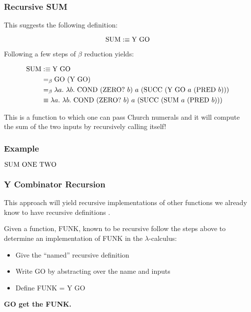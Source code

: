 \documentclass{beamer}
\begin{document}
\begin{frame}
	\frametitle{Recursive SUM}

	This suggests the following definition:

	$$\text{SUM} :\equiv \text{Y} \ \text{GO}$$

	Following a few steps of $\beta$ reduction yields:

	\begin{align*}
		\SUM &:\equiv \YCOMB \ \GO \\
		&\beq \GO \ (\YCOMB \ \GO) \\
		&\beq \lambda a. \ \lambda b. \ \COND \ (\ISITZERO \ b) \ a \ (\SUCC \ (\YCOMB \ \GO \ a \ (\PRED \ b))) \\
		&\equiv \lambda a. \ \lambda b. \ \COND \ (\ISITZERO \ b) \ a \ (\SUCC \ (\SUM \ a \ (\PRED \ b)))
	\end{align*}

	This is a function to which one can pass Church numerals and it will compute the sum of the two inputs by recursively calling itself!

\end{frame}

\begin{frame}
	\frametitle{Example}
	
	$\text{SUM} \ \text{ONE} \ \text{TWO}$

	\vspace{6cm}

\end{frame}

\begin{frame}
	\frametitle{Y Combinator Recursion}

	This approach will yield recursive implementations of other functions we already know to have recursive definitions \cite{pierce}.
	
	Given a function, FUNK, known to be recursive follow the steps above to determine an implementation of FUNK in the $\lambda$-calculus:

	\begin{itemize}
		\item Give the ``named'' recursive definition
		\item Write GO by abstracting over the name and inputs
		\item Define FUNK = Y GO
	\end{itemize}

	\vspace{0.2cm}

	{\bf GO get the FUNK.}


\end{frame}
\end{document}
